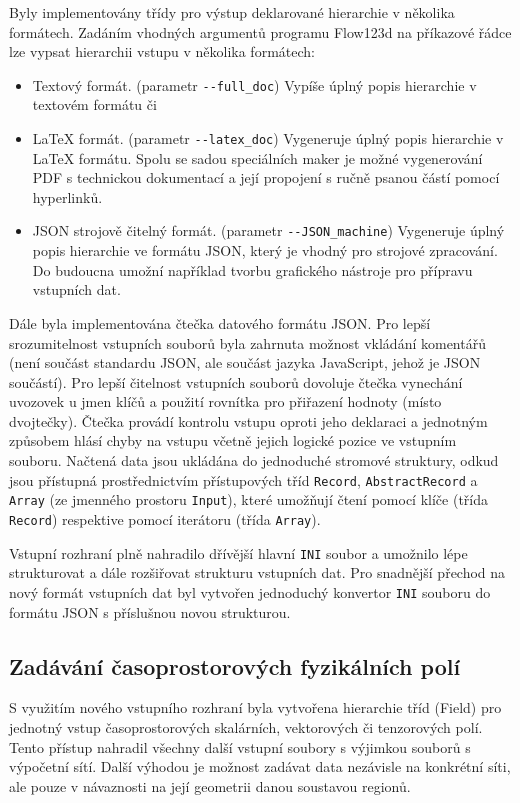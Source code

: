 \documentclass[11pt]{report}
\begin{document}
Byly implementovány třídy pro výstup deklarované hierarchie v několika 
formátech. Zadáním vhodných argumentů programu Flow123d na příkazové řádce
lze vypsat hierarchii vstupu v několika formátech:
\begin{itemize}
 \item Textový formát. (parametr \verb'--full_doc') Vypíše úplný popis 
hierarchie v textovém formátu či
 \item LaTeX formát. (parametr \verb'--latex_doc') Vygeneruje úplný popis 
hierarchie v LaTeX formátu. Spolu se sadou speciálních maker je možné 
vygenerování PDF s technickou dokumentací a její propojení s ručně psanou částí 
pomocí hyperlinků. 
 \item JSON strojově čitelný formát. (parametr \verb'--JSON_machine') Vygeneruje 
úplný popis hierarchie ve formátu JSON, který je vhodný pro strojové 
zpracování. Do budoucna umožní například tvorbu grafického nástroje pro 
přípravu vstupních dat.
\end{itemize}


Dále byla implementována čtečka datového formátu JSON. Pro lepší srozumitelnost 
vstupních souborů byla zahrnuta možnost vkládání komentářů (není součást 
standardu JSON, ale součást jazyka JavaScript, jehož je JSON součástí). 
Pro lepší čitelnost vstupních souborů dovoluje čtečka vynechání uvozovek u 
jmen klíčů a použití rovnítka pro přiřazení hodnoty (místo dvojtečky).
Čtečka provádí kontrolu vstupu oproti jeho deklaraci a jednotným způsobem hlásí 
chyby na vstupu včetně jejich logické pozice ve vstupním souboru. Načtená data 
jsou ukládána do jednoduché stromové struktury, odkud jsou přístupná 
prostřednictvím přístupových tříd \verb'Record', \verb'AbstractRecord' a 
\verb'Array' (ze jmenného prostoru \verb'Input'), které umožňují čtení pomocí 
klíče (třída \verb'Record') respektive pomocí iterátoru (třída \verb'Array').

Vstupní rozhraní plně nahradilo dřívější hlavní \verb'INI' soubor a umožnilo 
lépe strukturovat a dále rozšiřovat strukturu vstupních dat. Pro snadnější 
přechod na nový formát vstupních dat byl vytvořen jednoduchý konvertor 
\verb'INI' souboru do formátu JSON s příslušnou novou strukturou.  

\subsection{Zadávání časoprostorových fyzikálních polí}
S využitím nového vstupního rozhraní byla vytvořena hierarchie tříd (Field) pro 
jednotný vstup časoprostorových skalárních, vektorových či 
tenzorových polí. Tento přístup nahradil všechny další vstupní soubory 
s výjimkou souborů s výpočetní sítí. Další výhodou je možnost zadávat data 
nezávisle na konkrétní síti, ale pouze v  návaznosti na její geometrii danou 
soustavou regionů.
\end{document}
